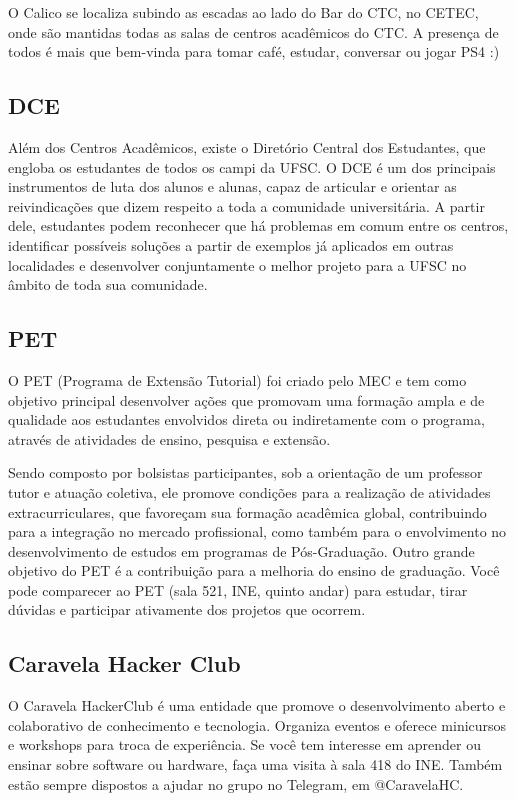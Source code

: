 \documentclass{article}
\begin{document}
O Calico se localiza subindo as escadas ao lado do Bar do CTC, no CETEC, onde são mantidas todas as salas de centros acadêmicos do CTC. A presença de todos é mais que bem-vinda para tomar café, estudar, conversar ou jogar PS4 :)

\subsection{DCE}
Além dos Centros Acadêmicos, existe o Diretório Central dos Estudantes, que engloba os estudantes de todos os campi da UFSC. O DCE é um dos principais instrumentos de luta dos
alunos e alunas, capaz de articular e orientar as reivindicações que dizem respeito a toda a
comunidade universitária. A partir dele, estudantes podem reconhecer que há problemas em
comum entre os centros, identificar possíveis soluções a partir de exemplos já aplicados em
outras localidades e desenvolver conjuntamente o melhor projeto para a UFSC no âmbito de
toda sua comunidade.

\subsection{PET}
O PET (Programa de Extensão Tutorial) foi criado pelo MEC e tem como objetivo principal desenvolver ações que promovam uma formação ampla e de qualidade aos estudantes envolvidos direta ou indiretamente com o programa, através de atividades de ensino, pesquisa e extensão.

Sendo composto por bolsistas participantes, sob a orientação de um professor tutor e atuação coletiva, ele promove condições para a realização de atividades extracurriculares, que favoreçam sua formação acadêmica global, contribuindo para a integração no mercado profissional, como também para o envolvimento no desenvolvimento de estudos em programas de Pós-Graduação. Outro grande objetivo do PET é a contribuição para a melhoria do ensino de graduação.
Você pode comparecer ao PET (sala 521, INE, quinto andar) para estudar, tirar dúvidas e participar ativamente dos projetos que ocorrem.

\subsection{Caravela Hacker Club}
O Caravela HackerClub é uma entidade que promove o desenvolvimento aberto e colaborativo de conhecimento e tecnologia. Organiza eventos e oferece minicursos e workshops para troca de experiência. Se você tem interesse em aprender ou ensinar sobre software ou hardware, faça uma visita à sala 418 do INE. Também estão sempre dispostos a ajudar no grupo no Telegram, em @CaravelaHC.
\end{document}
